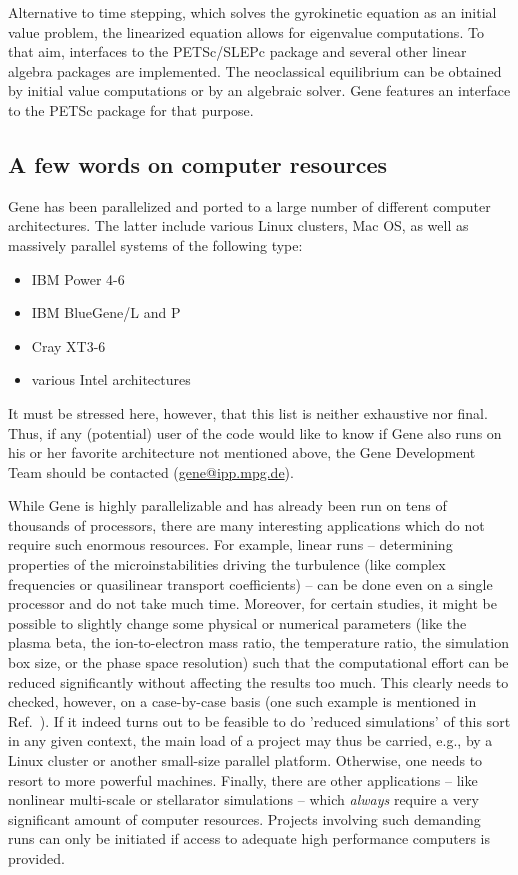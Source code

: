 \documentclass[12pt]{article}
\begin{document}
Alternative to time stepping, which solves the gyrokinetic equation as an initial value problem,
the linearized equation allows for eigenvalue computations. To that aim, interfaces 
to the PETSc/SLEPc package and several other linear algebra packages are implemented.
The neoclassical equilibrium can be obtained by initial value computations or by an algebraic solver.
{\sc Gene} features an interface to the PETSc package for that purpose.

\subsection{A few words on computer resources}\label{sec5}

{\sc Gene} has been parallelized and ported to a large number of different computer architectures.
The latter include various Linux clusters, Mac OS, as well as massively parallel systems of the following
type:
\begin{itemize}
\item IBM Power 4-6
\item IBM BlueGene/L and P
\item Cray XT3-6
\item various Intel architectures
\end{itemize}
It must be stressed here, however, that this list is neither exhaustive nor final. Thus, if any
(potential) user of the code would like to know if {\sc Gene} also runs on his or her favorite
architecture not mentioned above, the {\sc Gene} Development Team should be contacted
(\href{mailto:gene@ipp.mpg.de}{gene@ipp.mpg.de}).

While {\sc Gene} is highly parallelizable and has already been run on tens of thousands of
processors, there are many interesting applications which do not require such enormous resources.
For example, linear runs -- determining properties of the microinstabilities driving the turbulence
(like complex frequencies or quasilinear transport coefficients) -- can be done even on a single
processor and do not take much time. Moreover, for certain studies, it might be possible to slightly
change some physical or numerical parameters (like the plasma beta, the ion-to-electron mass ratio,
the temperature ratio, the simulation box size, or the phase space resolution) such that the
computational effort can be reduced significantly without affecting the results too much. This
clearly needs to checked, however, on a case-by-case basis (one such example is mentioned in
Ref.~\cite{gene2}). If it indeed turns out to be feasible to do 'reduced simulations' of this sort
in any given context, the main load of a project may thus be carried, e.g., by a Linux cluster
or another small-size parallel platform. Otherwise, one needs to resort to more powerful machines.
Finally, there are other applications -- like nonlinear multi-scale or stellarator simulations --
which {\em always} require a very significant amount of computer resources. Projects involving such
demanding runs can only be initiated if access to adequate high performance computers is provided.
\end{document}
